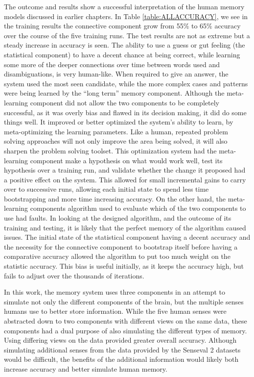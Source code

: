 The outcome and results show a successful interpretation of the human memory
models discussed in earlier chapters. In Table \ref{table:ALLACCURACY}, we see in
the training results the connective component grow from 55\% to 65\% accuracy
over the course of the five training runs. The test results are not as extreme
but a steady increase in accuracy is seen.  The ability to use a guess or gut
feeling (the statistical component) to have a decent chance at being correct,
while learning some more of the deeper connections over time between words used
and disambiguations, is very human-like.  When required to give an answer, the
system used the most seen candidate, while the more complex cases and patterns
were being learned by the ``long term'' memory component.  Although the meta-learning component did not allow the two components to be completely successful,
as it was overly bias and flawed in its decision making, it did do some things
well. It improved or better optimized the system's ability to learn, by meta-optimizing the learning parameters. Like a human, repeated problem solving
approaches will not only improve the area being solved, it will also sharpen the
problem solving toolset. This optimization system had the meta-learning
component make a hypothesis on what would work well, test its hypothesis over a
training run, and validate whether the change it proposed had a positive effect
on the system. This allowed for small incremental gains to carry over to
successive runs, allowing each initial state to spend less time bootstrapping
and more time increasing accuracy. On the other hand, the meta-learning
components algorithm used to evaluate which of the two components to use had
faults.  In looking at the designed algorithm, and the outcome of its training
and testing, it is likely that the perfect memory of the algorithm caused issues.
The initial state of the statistical component having a decent accuracy and the
necessity for the connective component to bootstrap itself before having a
comparative accuracy allowed the algorithm to put too much weight on the
statistic accuracy.  This bias is useful initially, as it keeps the accuracy
high, but fails to adjust over the thousands of iterations.

In this work, the memory system uses three components in an attempt to simulate
not only the different components of the brain, but the multiple senses humans
use to better store information. While the five human senses were abstracted
down to two components with different views on the same data, these components
had a dual purpose of also simulating the different types of memory. 
Using differing views on the data provided greater overall
accuracy. Although simulating additional senses from the data provided by the
Senseval 2 datasets would be difficult, the benefits of the additional
information would likely both increase accuracy and better simulate human
memory.

